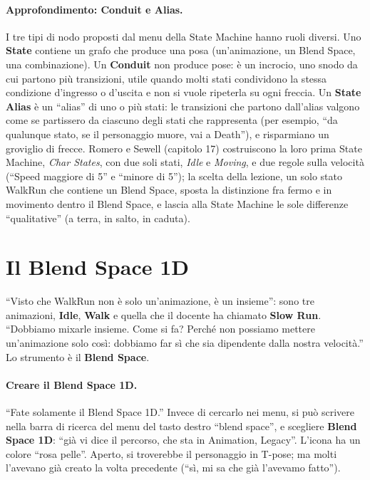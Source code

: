 \paragraph{Approfondimento: Conduit e Alias.} I tre tipi di nodo proposti dal menu della
State Machine hanno ruoli diversi. Uno \textbf{State} contiene un grafo che produce una
posa (un'animazione, un Blend Space, una combinazione). Un \textbf{Conduit} non produce
pose: è un incrocio, uno snodo da cui partono più transizioni, utile quando molti stati
condividono la stessa condizione d'ingresso o d'uscita e non si vuole ripeterla su ogni
freccia. Un \textbf{State Alias} è un ``alias'' di uno o più stati: le transizioni che
partono dall'alias valgono come se partissero da ciascuno degli stati che rappresenta
(per esempio, ``da qualunque stato, se il personaggio muore, vai a Death''), e
risparmiano un groviglio di frecce. Romero e Sewell (capitolo 17) costruiscono la loro
prima State Machine, \emph{Char States}, con due soli stati, \emph{Idle} e
\emph{Moving}, e due regole sulla velocità (``Speed maggiore di 5'' e ``minore di 5''); la
scelta della lezione, un solo stato WalkRun che contiene un Blend Space, sposta la
distinzione fra fermo e in movimento dentro il Blend Space, e lascia alla State Machine
le sole differenze ``qualitative'' (a terra, in salto, in caduta).

\section{Il Blend Space 1D}
\label{ue9:sec:blend1d}

``Visto che WalkRun non è solo un'animazione, è un insieme'': sono tre animazioni,
\textbf{Idle}, \textbf{Walk} e quella che il docente ha chiamato \textbf{Slow Run}.
``Dobbiamo mixarle insieme. Come si fa? Perché non possiamo mettere un'animazione solo
così: dobbiamo far sì che sia dipendente dalla nostra velocità.'' Lo strumento è il
\textbf{Blend Space}.

\paragraph{Creare il Blend Space 1D.} ``Fate solamente il Blend Space 1D.'' Invece di
cercarlo nei menu, si può scrivere nella barra di ricerca del menu del tasto destro
``blend space'', e scegliere \textbf{Blend Space 1D}: ``già vi dice il percorso, che sta
in Animation, Legacy''. L'icona ha un colore ``rosa pelle''. Aperto, si troverebbe il
personaggio in T-pose; ma molti l'avevano già creato la volta precedente (``sì, mi sa che
già l'avevamo fatto'').

